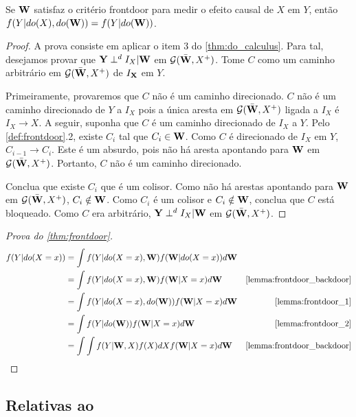 \begin{lemma}
 \label{lemma:frontdoor_2}
 Se ${\mathbf{W}}$ satisfaz o critério frontdoor para
 medir o efeito causal de $X$ em $Y$, então
 $f(Y|do(X),do({\mathbf{W}})) = f(Y|do({\mathbf{W}}))$.
\end{lemma}

\begin{proof}
 A prova consiste em aplicar o item 3 do \cref{thm:do_calculus}.
 Para tal, desejamos provar que
 ${\mathbf{Y}} \perp^d I_{X} | {\mathbf{W}}$ em ${\mathcal G}(\bar{{\mathbf{W}}}, X^{+})$.
 Tome $C$ como um caminho arbitrário 
 em ${\mathcal G}(\bar{{\mathbf{W}}}, X^{+})$ de $I_{{\mathbf{X}}}$ em $Y$.
 
 Primeiramente, provaremos que $C$ não é um caminho direcionado.
 $C$ não é um caminho direcionado de $Y$ a $I_{X}$ pois
 a única aresta em ${\mathcal G}(\bar{{\mathbf{W}}}, X^{+})$ ligada a $I_{X}$ é
 $I_{X} \rightarrow X$. A seguir, 
 suponha que $C$ é um caminho direcionado de $I_{X}$ a $Y$.
 Pelo \cref{def:frontdoor}.2, existe $C_i$ tal que
 $C_i \in {\mathbf{W}}$. Como $C$ é direcionado de $I_X$ em $Y$,
 $C_{i-1} \rightarrow C_i$. Este é um absurdo, pois
 não há aresta apontando para ${\mathbf{W}}$ em ${\mathcal G}(\bar{{\mathbf{W}}}, X^{+})$.
 Portanto, $C$ não é um caminho direcionado.
 
 Conclua que existe $C_i$ que é um colisor.
 Como não há arestas apontando para ${\mathbf{W}}$ em ${\mathcal G}(\bar{{\mathbf{W}}}, X^{+})$,
 $C_i \notin {\mathbf{W}}$. Como $C_i$ é um colisor e $C_i \notin {\mathbf{W}}$,
 conclua que $C$ está bloqueado.
 Como $C$ era arbitrário,
 ${\mathbf{Y}} \perp^d I_{X} | {\mathbf{W}}$ em ${\mathcal G}(\bar{{\mathbf{W}}}, X^{+})$.
\end{proof}

\begin{proof}[Prova do \cref{thm:frontdoor}]
 \begin{align*}
  f(Y|do(X=x))
  &= \int f(Y|do(X=x),\W)f(\W|do(X=x))d\W \\
  &= \int f(Y|do(X=x),\W)f(\W|X=x)d\W 
  & \text{\cref{lemma:frontdoor_backdoor}} \\
  &= \int f(Y|do(X=x),do(\W))f(\W|X=x)d\W 
  & \text{\cref{lemma:frontdoor_1}} \\
  &= \int f(Y|do(\W))f(\W|X=x)d\W 
  & \text{\cref{lemma:frontdoor_2}} \\
  &= \int \int f(Y|\W,X)f(X)dX f(\W|X=x)d\W
  & \text{\cref{lemma:frontdoor_backdoor}}
 \end{align*}
\end{proof}

\subsection{Relativas ao }

